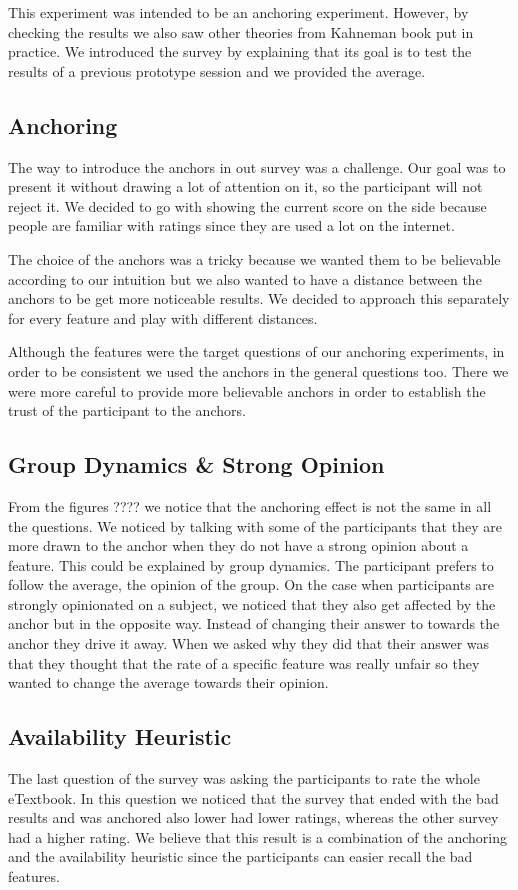 \documentclass[Main.tex]{subfiles}
\begin{document}
This experiment was intended to be an anchoring experiment. However, by checking the results we also saw other theories from Kahneman book  put in practice. We introduced the survey by explaining that its goal is to test the results of a previous prototype session and we provided the average. 

\subsection{Anchoring}
The way to introduce the anchors in out survey was a challenge. Our goal was to present it without drawing a lot of attention on it, so the participant will not reject it. We decided to go with showing the current score on the side because people are familiar with ratings since they are used a lot on the internet.

The choice of the anchors was a tricky because we wanted them to be believable according to our intuition but we also wanted to have a distance between the anchors to be get more noticeable results. We decided to approach this separately for every feature and play with different distances.

Although the features were the target questions of our anchoring experiments, in order to be consistent we used the anchors in the general questions too. There we were more careful to provide more believable anchors in order to establish the trust of the participant to the anchors.


\subsection{Group Dynamics \& Strong Opinion}
From the figures ???? we notice that the anchoring effect is not the same in all the questions. We noticed by talking with some of the participants that they are more drawn to the anchor when they do not have a strong opinion about a feature. This could be explained by group dynamics. The participant prefers to follow the average, the opinion of the group. On the case when  participants are strongly opinionated on a subject, we noticed that they also get affected by the anchor but in the opposite way. Instead of changing their answer to towards the anchor they drive it away. When we asked why they did that their answer was that they thought that the rate of a specific feature was really unfair so they wanted to change the average towards their opinion. 

\subsection{Availability Heuristic}
The last question of the survey was asking the participants to rate the whole eTextbook. In this question we noticed that the survey that ended with the bad results and was anchored also lower had lower ratings, whereas the other survey had a higher rating. We believe that this result is a combination of the anchoring and the availability heuristic since the participants can easier recall the bad features. 

\end{document}
